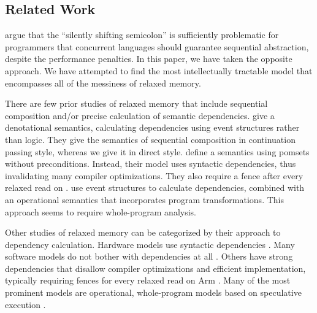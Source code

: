 \subsection{Related Work}

\citet{DBLP:conf/snapl/MarinoMMNS15} argue that the ``silently shifting
semicolon'' is sufficiently problematic for programmers that concurrent
languages should guarantee sequential abstraction, despite the performance
penalties.  In this paper, we have taken the opposite approach.  We have
attempted to find the most intellectually tractable model that encompasses
all of the messiness of relaxed memory.

There are few prior studies of relaxed memory that include sequential
composition and/or precise calculation of semantic dependencies.
\citet{DBLP:conf/esop/PaviottiCPWOB20} give a denotational semantics,
calculating dependencies using event structures rather than logic.  They give
the semantics of sequential composition in continuation passing style,
whereas we give it in direct style.
%
\citet{DBLP:journals/corr/abs-1804-04214} define a semantics
using pomsets without preconditions. Instead, their model uses syntactic
dependencies, thus invalidating many compiler optimizations.  They also
require a fence after every relaxed read on \armeight{}.
%
\citet{Pichon-Pharabod:2016:CSR:2837614.2837616} use event structures to
calculate dependencies, combined with an operational semantics that
incorporates program transformations.  This approach seems to require
whole-program analysis.

Other studies of relaxed memory can be categorized by their approach to
dependency calculation.  Hardware models use syntactic dependencies
\cite{alglave}.  Many software models do not bother with dependencies at all
\cite{Batty:2011:MCC:1926385.1926394, DBLP:journals/pacmpl/WattRP19,
  DBLP:conf/pldi/WattPPBDFPG20, goMM}.  Others have strong dependencies that
disallow compiler optimizations and efficient implementation, typically
requiring fences for every relaxed read on Arm
\cite{Lamport:1979:MMC:1311099.1311750, DBLP:conf/pldi/LahavVKHD17,
  Dolan:2018:BDR:3192366.3192421, DBLP:conf/lics/JeffreyR16,
  Boehm:2014:OGA:2618128.2618134}. %
%
Many of the most prominent models are operational, whole-program models based
on speculative execution \cite{Manson:2005:JMM:1047659.1040336,
  DBLP:conf/esop/JagadeesanPR10,
  DBLP:conf/popl/KangHLVD17,DBLP:journals/pacmpl/ChakrabortyV19,DBLP:conf/pldi/LeeCPCHLV20,promising-ldrf}.

